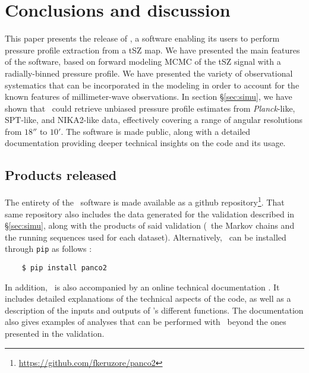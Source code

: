 \section{Conclusions and discussion}

This paper presents the release of \panco, a software enabling its users to perform pressure profile extraction from a tSZ map.
We have presented the main features of the software, based on forward modeling MCMC of the tSZ signal with a radially-binned pressure profile.
We have presented the variety of observational systematics that can be incorporated in the modeling in order to account for the known features of millimeter-wave observations.
In section \S\ref{sec:simu}, we have shown that \panco\ could retrieve unbiased pressure profile estimates from \textit{Planck}-like, SPT-like, and NIKA2-like data, effectively covering a range of angular resolutions from $18''$ to $10'$.
The software is made public, along with a detailed documentation providing deeper technical insights on the code and its usage.

\subsection{Products released}

The entirety of the \panco\ software is made available as a github repository\footnote{\url{https://github.com/fkeruzore/panco2}}.
That same repository also includes the data generated for the validation described in \S\ref{sec:simu}, along with the products of said validation (\ie\ the Markov chains and the running sequences used for each dataset).
Alternatively, \panco\ can be installed through \texttt{pip} as follows :
\begin{verbatim}
    $ pip install panco2
\end{verbatim}

In addition, \panco\ is also accompanied by an online technical documentation .
It includes detailed explanations of the technical aspects of the code, as well as a description of the inputs and outputs of \panco's different functions.
The documentation also gives examples of analyses that can be performed with \panco\ beyond the ones presented in the validation.

